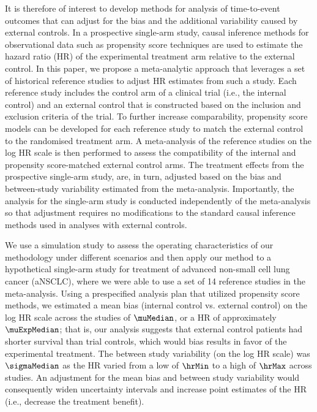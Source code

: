 \documentclass[11pt,final,fleqn]{article}\usepackage[]{graphicx}\usepackage[]{color}
\begin{document}
It is therefore of interest to develop methods for analysis of time-to-event outcomes that can adjust for the bias and the additional variability caused by external controls. 
In a prospective single-arm study, causal inference methods for observational data such as propensity score techniques are used to estimate the hazard ratio (HR) of the experimental treatment arm relative to the external control. In this paper, we propose a meta-analytic approach that leverages a set of historical reference studies to adjust HR estimates from such a study.  Each reference study includes the control arm of a clinical trial (i.e., the internal control) and an external control that is constructed based on the inclusion and exclusion criteria of the trial. To further increase comparability, propensity score models can be developed for each reference study to match the external control to the randomised treatment arm. A meta-analysis of the reference studies on the log HR scale is then performed to assess the compatibility of the internal and propensity score-matched external control arms. The treatment effects from the prospective single-arm study, are, in turn, adjusted based on the bias and between-study variability estimated from the meta-analysis. Importantly, the analysis for the single-arm study is conducted independently of the meta-analysis so that adjustment requires no modifications to the standard causal inference methods used in analyses with external controls. 

We use a simulation study to assess the operating characteristics of our methodology under different scenarios and then apply our method to a hypothetical single-arm study for treatment of advanced non-small cell lung cancer (aNSCLC), where we were able to use a set of 14 reference studies in the meta-analysis. Using a prespecified analysis plan that utilized propensity score methods, we estimated a mean bias (internal control vs. external control) on the log HR scale across the studies of $\muMedian$, or a HR of approximately $\muExpMedian$; that is, our analysis suggests that external control patients had shorter survival than trial controls, which would bias results in favor of the experimental treatment. The between study variability (on the log HR scale) was $\sigmaMedian$ as the HR varied from a low of $\hrMin$ to a high of $\hrMax$ across studies. An adjustment for the mean bias and between study variability would consequently widen uncertainty intervals and increase point estimates of the HR (i.e., decrease the treatment benefit). 
\end{document}
